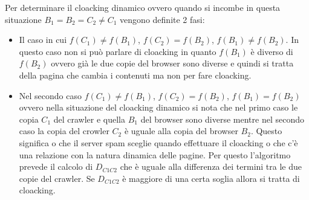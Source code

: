 Per determinare il cloacking dinamico ovvero quando si incombe in questa situazione \(B_1=B_2=C_2 \not =C_1\) vengono definite 2 fasi:
\begin{itemize}
 \item Il caso in cui \(f(C_1)\not=f(B_1)\), \(f(C_2)=f(B_2)\), \(f(B_1)\not=f(B_2)\). In questo caso non si può parlare di cloacking in quanto \(f(B_1)\) è diverso di \(f(B_2)\) ovvero già le due copie del browser sono diverse e quindi si tratta della pagina che cambia i contenuti ma non per fare cloacking.
 \item Nel secondo caso \(f(C_1)\not=f(B_1)\), \(f(C_2)=f(B_2)\), \(f(B_1)=f(B_2)\) ovvero nella situazione del cloacking dinamico si nota che nel primo caso le copia \(C_1\) del crawler e quella \(B_1\) del browser sono diverse mentre nel secondo caso la copia del crowler \(C_2\) è uguale alla copia del browser \(B_2\). Questo significa o che il server spam sceglie quando effettuare il cloacking o che c'è una relazione con la natura dinamica delle pagine. Per questo l'algoritmo prevede il calcolo di \(D_{C1C2}\) che è uguale alla differenza dei termini tra le due copie del crawler. Se \(D_{C1C2}\) è maggiore di una certa soglia allora si tratta di cloacking.
\end{itemize}

